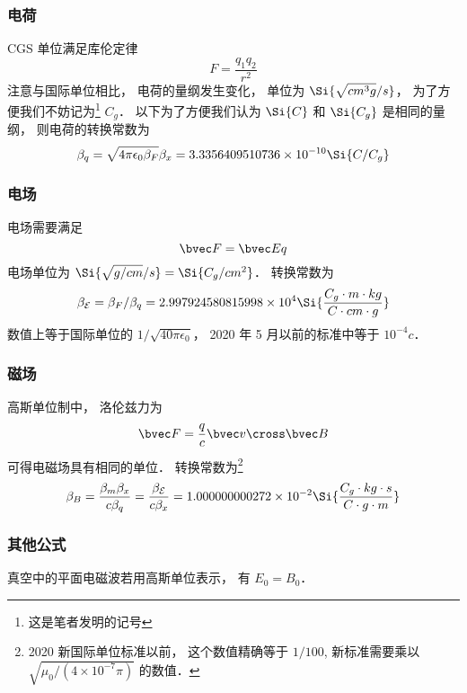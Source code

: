 

\subsubsection{电荷}
CGS 单位满足库伦定律
\begin{equation}\label{GaussU_eq1}
F = \frac{q_1 q_2}{r^2}
\end{equation}
注意与国际单位相比， 电荷的量纲发生变化， 单位为 $\Si{\sqrt{cm^3 g}/s}$， 为了方便我们不妨记为\footnote{这是笔者发明的记号} $C_g$． 以下为了方便我们认为 $\Si{C}$ 和 $\Si{C_g}$ 是相同的量纲， 则电荷的转换常数为
\begin{equation}
\beta_q = \sqrt{4\pi\epsilon_0\beta_F} \beta_x = 3.3356409510736\times 10^{-10} \Si{C/C_g}
\end{equation}

\subsubsection{电场}
电场需要满足
\begin{equation}
\bvec F = \bvec E q
\end{equation}
电场单位为 $\Si{\sqrt{g/cm}/s} = \Si{C_g/cm^2}$． 转换常数为
\begin{equation}
\beta_{\mathcal E} = \beta_F/\beta_q = 2.997924580815998\times 10^4 \Si{\frac{C_g\cdot m\cdot kg}{C\cdot cm\cdot g}}
\end{equation}
数值上等于国际单位的 $1/\sqrt{40\pi\epsilon_0}$， 2020 年 5 月以前的标准中等于 $10^{-4} c$．

\subsubsection{磁场}
高斯单位制中， 洛伦兹力为
\begin{equation}
\bvec F = \frac{q}{c} \bvec v \cross \bvec B
\end{equation}
可得电磁场具有相同的单位． 转换常数为\footnote{2020 新国际单位标准以前， 这个数值精确等于 $1/100$, 新标准需要乘以 $\sqrt{\mu_0/(4\times 10^{-7}\pi)}$ 的数值．}
\begin{equation}
\beta_B = \frac{\beta_m\beta_x}{c\beta_q} = \frac{\beta_{\mathcal E}}{c\beta_x} = 1.000000000272\times 10^{-2} \Si{\frac{C_g\cdot kg \cdot s}{C \cdot g \cdot m}}
\end{equation}

\subsubsection{其他公式}
真空中的平面电磁波若用高斯单位表示， 有 $E_0 = B_0$．

